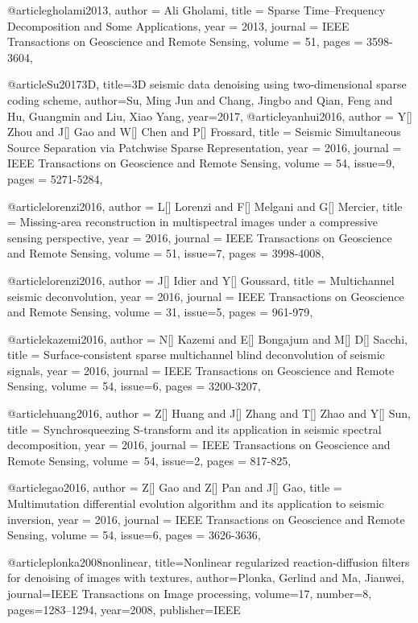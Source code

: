 @article{gholami2013,
  author =	 {Ali Gholami},
  title =	 {Sparse Time–Frequency Decomposition and Some Applications},
  year =	 2013,
  journal =	 {IEEE Transactions on Geoscience and Remote Sensing},
  volume =	 51,
  pages =	 {3598-3604},
}

@article{Su20173D,
  title={3D seismic data denoising using two-dimensional sparse coding scheme},
  author={Su, Ming Jun and Chang, Jingbo and Qian, Feng and Hu, Guangmin and Liu, Xiao Yang},
  year={2017},
}
@article{yanhui2016,
  author =	 {Y[] Zhou and J[] Gao and W[] Chen and P[] Frossard},
  title =	 {Seismic Simultaneous Source Separation via Patchwise Sparse Representation},
  year =	 2016,
  journal =	 {IEEE Transactions on Geoscience and Remote Sensing},
  volume =	 54,
  issue=9,
  pages =	 {5271-5284},
}

@article{lorenzi2016,
  author =	 {L[] Lorenzi and F[] Melgani and G[] Mercier},
  title =	 {Missing-area reconstruction in multispectral images under a compressive sensing perspective},
  year =	 2016,
  journal =	 {IEEE Transactions on Geoscience and Remote Sensing},
  volume =	 51,
  issue=7,
  pages =	 {3998-4008},
}

@article{lorenzi2016,
  author =	 {J[] Idier and Y[] Goussard},
  title =	 {Multichannel seismic deconvolution},
  year =	 2016,
  journal =	 {IEEE Transactions on Geoscience and Remote Sensing},
  volume =	 31,
  issue=5,
  pages =	 {961-979},
}

@article{kazemi2016,
  author =	 {N[] Kazemi and E[] Bongajum and M[] D[] Sacchi},
  title =	 {Surface-consistent sparse multichannel blind deconvolution of seismic signals},
  year =	 2016,
  journal =	 {IEEE Transactions on Geoscience and Remote Sensing},
  volume =	 54,
  issue=6,
  pages =	 {3200-3207},
}

@article{huang2016,
  author =	 {Z[] Huang and J[] Zhang and T[] Zhao and Y[] Sun},
  title =	 {Synchrosqueezing {S}-transform and its application in seismic spectral decomposition},
  year =	 2016,
  journal =	 {IEEE Transactions on Geoscience and Remote Sensing},
  volume =	 54,
  issue=2,
  pages =	 {817-825},
}

@article{gao2016,
  author =	 {Z[] Gao and Z[] Pan and J[] Gao},
  title =	 {Multimutation differential evolution algorithm and its application to seismic inversion},
  year =	 2016,
  journal =	 {IEEE Transactions on Geoscience and Remote Sensing},
  volume =	 54,
  issue=6,
  pages =	 {3626-3636},
}


@article{plonka2008nonlinear,
  title={Nonlinear regularized reaction-diffusion filters for denoising of images with textures},
  author={Plonka, Gerlind and Ma, Jianwei},
  journal={IEEE Transactions on Image processing},
  volume={17},
  number={8},
  pages={1283--1294},
  year={2008},
  publisher={IEEE}
}

